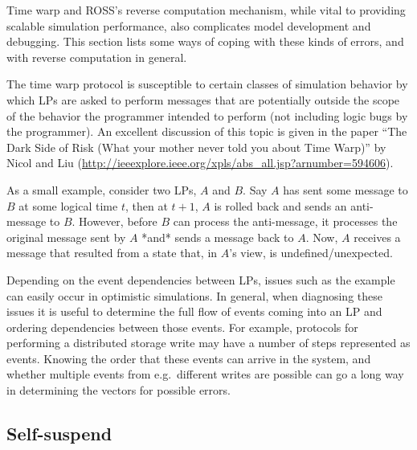 \documentclass[conference,10pt,compsocconf,onecolumn]{IEEEtran}
\begin{document}
Time warp and ROSS's reverse computation mechanism, while vital to providing
scalable simulation performance, also complicates model development and
debugging. This section lists some ways of coping with these kinds of errors,
and with reverse computation in general.

The time warp protocol is susceptible to certain classes of simulation behavior
by which LPs are asked to perform messages that are potentially outside the
scope of the behavior the programmer intended to perform (not including logic
bugs by the programmer). An excellent discussion of this topic is given in the
paper ``The Dark Side of Risk (What your mother never told you about Time
Warp)'' by Nicol and Liu
(\url{http://ieeexplore.ieee.org/xpls/abs_all.jsp?arnumber=594606}).

As a small example, consider two LPs, $A$ and $B$. Say $A$ has sent some
message to $B$ at some logical time $t$, then at $t+1$, $A$ is rolled back and
sends an anti-message to $B$. However, before $B$ can process the anti-message,
it processes the original message sent by $A$ *and* sends a message back to
$A$. Now, $A$ receives a message that resulted from a state that, in $A$'s
view, is undefined/unexpected.

Depending on the event dependencies between LPs, issues such as the example can
easily occur in optimistic simulations. In general, when diagnosing these
issues it is useful to determine the full flow of events coming into an LP and
ordering dependencies between those events. For example, protocols for
performing a distributed storage write may have a number of steps represented
as events. Knowing the order that these events can arrive in the system, and
whether multiple events from e.g.\ different writes are possible can go a
long way in determining the vectors for possible errors.

\subsection{Self-suspend}
\end{document}
